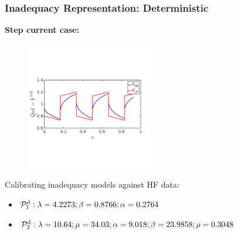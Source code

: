 \documentclass[10pt,xcolor=dvipsnames,compress]{beamer}
\begin{document}
\begin{frame}
\frametitle{Inadequacy Representation: Deterministic}
\textbf{Step current case:}

\vfill

\begin{figure}
\includegraphics[trim = 0.in  2.3in 0.in 2.8in.in, clip, width=0.5\textwidth]{figs/Istep_V_hf_lf.png}
\end{figure}

\vspace{-0.1in}

Calibrating inadequacy models against HF data: 

\begin{itemize}

\item $\mathcal{P}_1^{\rm d}:   \lambda = 4.2273; \beta = 0.8766; \alpha = 0.2764$

\item $\mathcal{P}_2^{\rm d}:   \lambda = 10.64; \mu = 34.03; \alpha = 9.018; \beta = 23.9858; \rho = 0.3048$

\end{itemize}

\vspace{-0.1in}


\end{frame}
\end{document}
